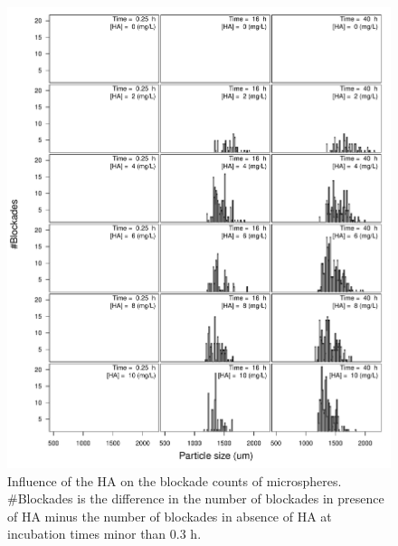 \documentclass[journal=langd5,manuscript=article]{achemso}
\begin{document}
 \begin{figure}
  \includegraphics[width=\linewidth]{Figures/HA_density.pdf}
  \caption{Influence of the HA on the blockade counts of microspheres. \#Blockades is the difference in the number of blockades in presence of HA minus the number of blockades in absence of HA at incubation times minor than 0.3 h.} 
  \label{fgr:HA_density}
\end{figure}
\end{document}
